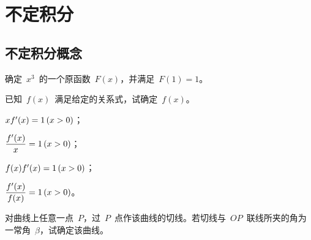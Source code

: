 

\chapter{不定积分}\label{ch:6}
\section{不定积分概念}
\begin{exercise}
\item 确定~$x^3$~的一个原函数~$F(x)$，并满足~$F(1)=1$。
\item 已知~$f(x)$~满足给定的关系式，试确定~$f(x)$。
\begin{exlistcols}
  \item $xf'(x)=1\mcond{x>0}$；
  \item $\dfrac{f'(x)}x=1\mcond{x>0}$；
  \item $f(x)f'(x)=1\mcond{x>0}$；
  \item $\dfrac{f'(x)}{f(x)}=1\mcond{x>0}$。
\end{exlistcols}
\item 对曲线上任意一点~$P$，过~$P$~点作该曲线的切线。若切线与~$OP$~联线所夹的角为一常角~$\beta$，试确定该曲线。
\end{exercise}

